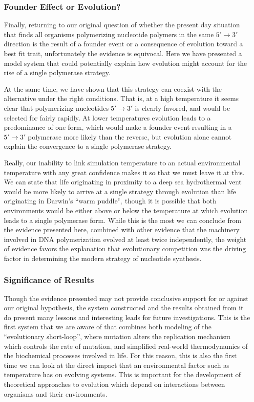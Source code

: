\subsubsection*{Founder Effect or Evolution?}
Finally, returning to our original question of whether the present day situation that finds all organisms polymerizing nucleotide polymers in the same $5'\to3'$ direction is the result of a founder event or a consequence of evolution toward a best fit trait, unfortunately the evidence is equivocal. Here we have presented a model system that could potentially explain how evolution might account for the rise of a single polymerase strategy.

At the same time, we have shown that this strategy can coexist with the alternative under the right conditions. That is, at a high temperature it seems clear that polymerizing nucleotides $5'\to3'$ is clearly favored, and would be selected for fairly rapidly. At lower temperatures evolution leads to a predominance of one form, which would make a founder event resulting in a $5'\to3'$ polymerase more likely than the reverse, but evolution alone cannot explain the convergence to a single polymerase strategy.

Really, our inability to link simulation temperature to an actual environmental temperature with any great confidence makes it so that we must leave it at this. We can state that life originating in proximity to a deep sea hydrothermal vent would be more likely to arrive at a single strategy through evolution than life originating in Darwin's ``warm puddle'', though it is possible that both environments would be either above or below the temperature at which evolution leads to a single polymerase form. While this is the most we can conclude from the evidence presented here, combined with other evidence that the machinery involved in DNA polymerization evolved at least twice independently\cite{Leipe:1999p1040}, the weight of evidence favors the explanation that evolutionary competition was the driving factor in determining the modern strategy of nucleotide synthesis.


\subsubsection*{Significance of Results}
Though the evidence presented may not provide conclusive support for or against our original hypothesis, the system constructed and the results obtained from it do present many lessons and interesting leads for future investigations. This is the first system that we are aware of that combines both modeling of the ``evolutionary short-loop'', where mutation alters the replication mechanism which controls the rate of mutation, and simplified real-world thermodynamics of the biochemical processes involved in life. For this reason, this is also the first time we can look at the direct impact that an environmental factor such as temperature has on evolving systems. This is important for the development of theoretical approaches to evolution which depend on interactions between organisms and their environments.

